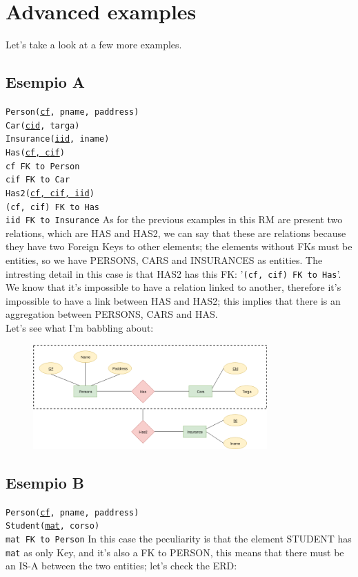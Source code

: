 \documentclass[12pt, oneside]{report}
\newcommand\tab[1][1cm]{\hspace*{#1}}
\begin{document}
\section{Advanced examples}
Let's take a look at a few more examples.

\subsection*{Esempio A}
\texttt{Person(\underline{cf}, pname, paddress)}\\
\texttt{Car(\underline{cid}, targa)}\\
\texttt{Insurance(\underline{iid}, iname)}\\
\texttt{Has(\underline{cf, cif})}\\
\tab[.4cm] \texttt{cf FK to Person}\\
\tab[.4cm] \texttt{cif FK to Car}\\
\texttt{Has2(\underline{cf, cif, iid})}\\
\tab[.4cm] \texttt{(cf, cif) FK to Has}\\
\tab[.4cm] \texttt{iid FK to Insurance}
\vskip 8pt
As for the previous examples in this RM are present two relations, which are HAS and HAS2, we can say that these are relations because they have two Foreign Keys to other elements; the elements without FKs must be entities, so we have PERSONS, CARS and INSURANCES as entities.
The intresting detail in this case is that HAS2 has this FK: '\texttt{(cf, cif) FK to Has}'.\\
We know that it's impossible to have a relation linked to another, therefore it's impossible to have a link between HAS and HAS2; this implies that there is an aggregation between PERSONS, CARS and HAS.\\
Let's see what I'm babbling about:
\begin{figure}[H]
	\centering
	\includegraphics[width=0.8\textwidth,keepaspectratio]{diagram6_00.png}
	\label{diagram6_00}
\end{figure}

\subsection*{Esempio B}
\texttt{Person(\underline{cf}, pname, paddress)}\\
\texttt{Student(\underline{mat}, corso)}\\
\tab[.4cm] \texttt{mat FK to Person}
\vskip 8pt
In this case the peculiarity is that the element STUDENT has \texttt{mat} as only Key, and it's also a FK to PERSON, this means that there must be an IS-A between the two entities; let's check the ERD:
\end{document}
